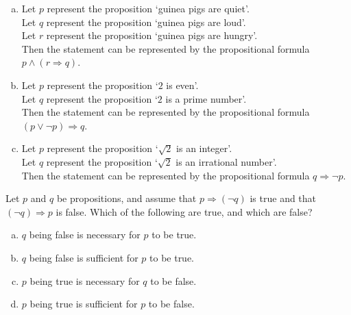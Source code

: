 \begin{mysolution}
    \begin{enumerate}[(a)]
    \item Let $p$ represent the proposition `guinea pigs are quiet'.\\
    Let $q$ represent the proposition `guinea pigs are loud'.\\
    Let $r$ represent the proposition `guinea pigs are hungry'. \\
    Then the statement can be represented by the propositional formula $p \wedge (r \Rightarrow q)$.
    \item Let $p$ represent the proposition `$2$ is even'.\\
    Let $q$ represent the proposition `$2$ is a prime number'. \\
    Then the statement can be represented by the propositional formula $(p \vee \neg p) \Rightarrow q$.
    \item Let $p$ represent the proposition `$\sqrt{2}$ is an integer'.\\
    Let $q$ represent the proposition `$\sqrt{2}$ is an irrational number'.\\
    Then the statement can be represented by the propositional formula $q \Rightarrow \neg p$.
    \end{enumerate}
\end{mysolution}

\begin{chapex}
Let $p$ and $q$ be propositions, and assume that $p \Rightarrow (\neg q)$ is true and that $(\neg q) \Rightarrow p$ is false. Which of the following are true, and which are false?
\begin{enumerate}[(a)]
\item $q$ being false is necessary for $p$ to be true.
\item $q$ being false is sufficient for $p$ to be true.
\item $p$ being true is necessary for $q$ to be false.
\item $p$ being true is sufficient for $p$ to be false.
\end{enumerate}
\end{chapex}

